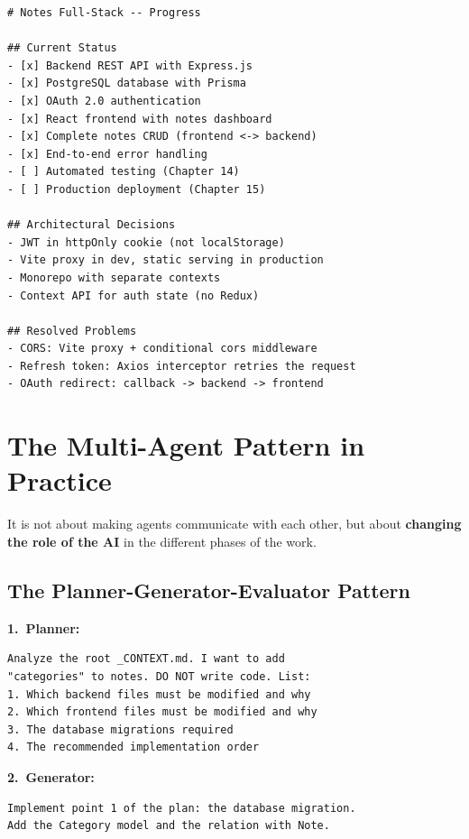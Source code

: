 \begin{praticabox}[title={Hands-On --- Create \texttt{PROGRESS.md}}]
\begin{lstlisting}[language={},title={Example progress file}]
# Notes Full-Stack -- Progress

## Current Status
- [x] Backend REST API with Express.js
- [x] PostgreSQL database with Prisma
- [x] OAuth 2.0 authentication
- [x] React frontend with notes dashboard
- [x] Complete notes CRUD (frontend <-> backend)
- [x] End-to-end error handling
- [ ] Automated testing (Chapter 14)
- [ ] Production deployment (Chapter 15)

## Architectural Decisions
- JWT in httpOnly cookie (not localStorage)
- Vite proxy in dev, static serving in production
- Monorepo with separate contexts
- Context API for auth state (no Redux)

## Resolved Problems
- CORS: Vite proxy + conditional cors middleware
- Refresh token: Axios interceptor retries the request
- OAuth redirect: callback -> backend -> frontend
\end{lstlisting}
\end{praticabox}

\section{The Multi-Agent Pattern in Practice}

It is not about making agents communicate with each other, but about \textbf{changing the role of the AI} in the different phases of the work.

\subsection{The Planner-Generator-Evaluator Pattern}

\textbf{1.\ Planner:}
\begin{lstlisting}[language={}]
Analyze the root _CONTEXT.md. I want to add
"categories" to notes. DO NOT write code. List:
1. Which backend files must be modified and why
2. Which frontend files must be modified and why
3. The database migrations required
4. The recommended implementation order
\end{lstlisting}

\textbf{2.\ Generator:}
\begin{lstlisting}[language={}]
Implement point 1 of the plan: the database migration.
Add the Category model and the relation with Note.
\end{lstlisting}

